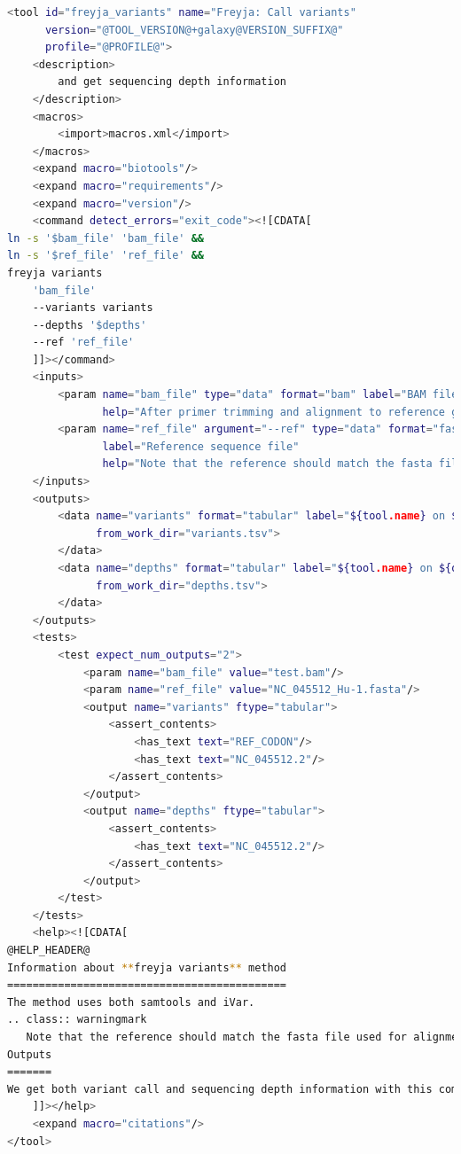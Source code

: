 \begin{lstlisting}[language=bash, caption=tool wrapper for Freyja: Call variants and get
sequencing depth information, label=list:methods:wrapper-freyja-call]
<tool id="freyja_variants" name="Freyja: Call variants"
      version="@TOOL_VERSION@+galaxy@VERSION_SUFFIX@"
      profile="@PROFILE@">
    <description>
        and get sequencing depth information
    </description>
    <macros>
        <import>macros.xml</import>
    </macros>
    <expand macro="biotools"/>
    <expand macro="requirements"/>
    <expand macro="version"/>
    <command detect_errors="exit_code"><![CDATA[
ln -s '$bam_file' 'bam_file' &&
ln -s '$ref_file' 'ref_file' &&
freyja variants 
    'bam_file'
    --variants variants 
    --depths '$depths'
    --ref 'ref_file'
    ]]></command>
    <inputs>
        <param name="bam_file" type="data" format="bam" label="BAM file"
               help="After primer trimming and alignment to reference genome."/>
        <param name="ref_file" argument="--ref" type="data" format="fasta"
               label="Reference sequence file"
               help="Note that the reference should match the fasta file used for alignment."/>
    </inputs>
    <outputs>
        <data name="variants" format="tabular" label="${tool.name} on ${on_string}: Variant call"
              from_work_dir="variants.tsv">
        </data>
        <data name="depths" format="tabular" label="${tool.name} on ${on_string}: Sequencing depth"
              from_work_dir="depths.tsv">
        </data>
    </outputs>
    <tests>
        <test expect_num_outputs="2">
            <param name="bam_file" value="test.bam"/>
            <param name="ref_file" value="NC_045512_Hu-1.fasta"/>
            <output name="variants" ftype="tabular">
                <assert_contents>
                    <has_text text="REF_CODON"/>
                    <has_text text="NC_045512.2"/>
                </assert_contents>
            </output>
            <output name="depths" ftype="tabular">
                <assert_contents>
                    <has_text text="NC_045512.2"/>
                </assert_contents>
            </output>
        </test>
    </tests>
    <help><![CDATA[
@HELP_HEADER@
Information about **freyja variants** method
============================================
The method uses both samtools and iVar. 
.. class:: warningmark
   Note that the reference should match the fasta file used for alignment. 
Outputs
=======
We get both variant call and sequencing depth information with this command.
    ]]></help>
    <expand macro="citations"/>
</tool>
\end{lstlisting}
